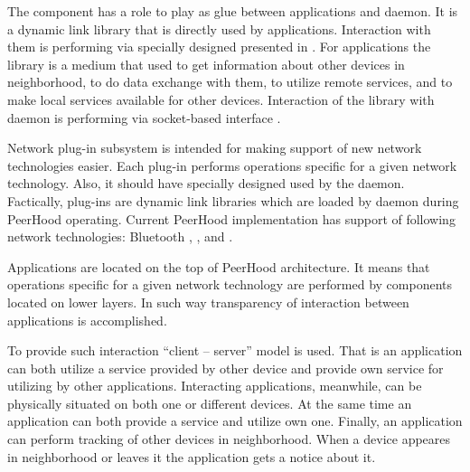 
%
The component has a role to play as glue between applications and daemon. 
%
It is a dynamic link library that is directly used by applications. 
%
Interaction with them is performing via specially designed  presented in . 
%
For applications the library is a medium that used to get information about other devices in neighborhood, to do data exchange with them, to utilize remote services, and to make local services available for other devices. 
%
Interaction of the library with daemon is performing via socket-based interface . 



%
Network plug-in subsystem is intended for making support of new network technologies easier. 
%
Each plug-in performs operations specific for a given network technology. 
%
Also, it should have specially designed  used by the daemon. 
%
Factically, plug-ins are dynamic link libraries which are loaded by daemon during PeerHood operating. 
%
Current PeerHood implementation has support of  following network technologies: Bluetooth ,  , and  . 



%
Applications are located on the top of PeerHood architecture. 
%
It means that operations specific for a given network technology are performed by components located on lower layers. 
%
In such \The way transparency of interaction between applications is accomplished. 

%
To provide such interaction ``client -- server'' model is used. 
%
That is an application can both utilize a service provided by other device and provide own service for utilizing by other applications. 
%
Interacting applications, meanwhile, can be physically situated on both one or different devices. 
%
At the same time an application can both provide a service and utilize own one. 
%
Finally, an application can perform tracking of other devices in neighborhood. 
%
When a device appeares in neighborhood or leaves it the application gets a notice about it. 